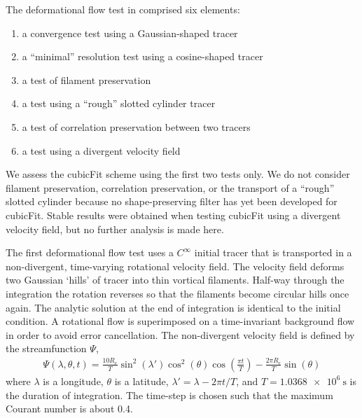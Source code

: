 The deformational flow test in \citep{lauritzen2012} comprised six elements:
\begin{enumerate}
\item a convergence test using a Gaussian-shaped tracer
\item a ``minimal'' resolution test using a cosine-shaped tracer
\item a test of filament preservation
\item a test using a ``rough'' slotted cylinder tracer
\item a test of correlation preservation between two tracers
\item a test using a divergent velocity field
\end{enumerate}
We assess the cubicFit scheme using the first two tests only.  We do not consider filament preservation, correlation preservation, or the transport of a ``rough'' slotted cylinder because no shape-preserving filter has yet been developed for cubicFit.  Stable results were obtained when testing cubicFit using a divergent velocity field, but no further analysis is made here.  

The first deformational flow test uses a $C^\infty$ initial tracer that is transported in a non-divergent, time-varying rotational velocity field.
The velocity field deforms two Gaussian `hills' of tracer into thin vortical filaments.  Half-way through the integration the rotation reverses so that the filaments become circular hills once again.  The analytic solution at the end of integration is identical to the initial condition.
A rotational flow is superimposed on a time-invariant background flow in order to avoid error cancellation.
The non-divergent velocity field is defined by the streamfunction $\Psi$,
\begin{align}
	\Psi(\lambda, \theta, t) = \frac{10 R_e}{T} \sin^2 \left(\lambda'\right) \cos^2 \left(\theta\right) \cos \left( \frac{\pi t}{T} \right) - \frac{2 \pi R_e}{T} \sin\left(\theta\right)
\end{align}
where $\lambda$ is a longitude, $\theta$ is a latitude, $\lambda' = \lambda - 2 \pi t / T$, and $T = \SI{1.0368e6}{\second}$ is the duration of integration.  The time-step is chosen such that the maximum Courant number is about 0.4.

